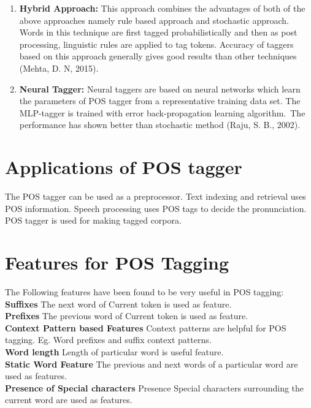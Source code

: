 \documentclass[12pt,a4paper,oneside]{memoir}
\begin{document}
\begin{enumerate}
  \item \textbf{Hybrid Approach:} This approach combines the advantages of both of the above approaches namely rule based approach and stochastic approach. Words in this technique are first tagged probabilistically and then as post processing, linguistic rules are applied to tag tokens. Accuracy of taggers based on this approach generally gives good results than other techniques (Mehta, D. N, 2015).
  \item \textbf{Neural Tagger:} Neural taggers are based on neural networks which learn the parameters of POS tagger from a representative training data set. The MLP-tagger is trained with error back-propagation learning algorithm. The performance has shown better than stochastic method (Raju, S. B., 2002).

\end{enumerate}

\section{Applications of POS tagger} The POS tagger can be used as a preprocessor. Text indexing and retrieval uses POS information. Speech processing uses POS tags to decide the pronunciation. POS tagger is used for making tagged corpora. 

\section{Features for POS Tagging}
The Following features have been found to be very useful in POS tagging: \\

\textbf{Suffixes} The next word of Current token is used as feature.\\

\textbf{Prefixes} The previous word of Current token is used as feature.\\

\textbf{Context Pattern based Features} Context patterns are helpful for POS tagging. Eg. Word prefixes and suffix context patterns. \\

\textbf{Word length} Length of particular word is useful feature. \\

\textbf{Static Word Feature} The previous and next words of a particular word are used as features.\\

\textbf{Presence of Special characters} Presence Special characters surrounding the current word are used as features.\\
\end{document}
